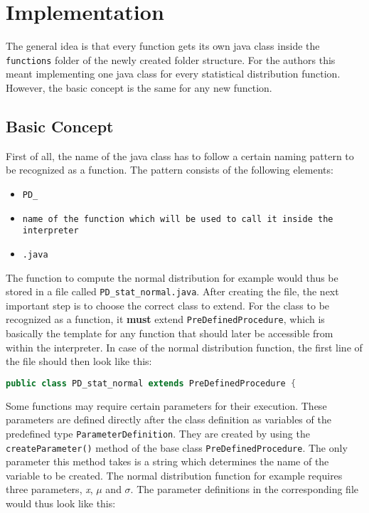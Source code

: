 

\chapter{Implementation}

The general idea is that every function gets its own java class inside the \lstinline{functions} folder of the newly created folder structure. For the authors this meant implementing one java class for every statistical distribution function. However, the basic concept is the same for any new function. 

\section{Basic Concept}

First of all, the name of the java class has to follow a certain naming pattern to be recognized as a function. The pattern consists of the following elements:

\begin{itemize}
	\item \lstinline{PD_}
	\item \lstinline{name of the function which will be used to call it inside the interpreter}
	\item \lstinline{.java}
\end{itemize}

The function to compute the normal distribution for example would thus be stored in a file called \lstinline{PD_stat_normal.java}. After creating the file, the next important step is to choose the correct class to extend. For the class to be recognized as a function, it \textbf{must} extend \lstinline{PreDefinedProcedure}, which is basically the template for any function that should later be accessible from within the interpreter. In case of the normal distribution function, the first line of the file should then look like this:

\begin{center}
	\begin{lstlisting}[caption={Class Definition}, language={java}, label=lis:classDefinition]
		public class PD_stat_normal extends PreDefinedProcedure {
	\end{lstlisting}
\end{center}

Some functions may require certain parameters for their execution. These parameters are defined directly after the class definition as variables of the predefined type \lstinline{ParameterDefinition}. They are created by using the \lstinline{createParameter()} method of the base class \lstinline{PreDefinedProcedure}. The only parameter this method takes is a string which determines the name of the variable to be created. The normal distribution function for example requires three parameters, \textit{x}, $\mu$ and $\sigma$. The parameter definitions in the corresponding file would thus look like this:

